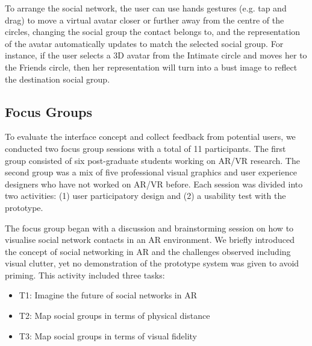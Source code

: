 To arrange the social network, the user can use hands gestures (e.g. tap and drag) to move a virtual avatar closer or further away from the centre of the circles, changing the social group the contact belongs to, and the representation of the avatar automatically updates to match the selected social group. For instance, if the user selects a 3D avatar from the Intimate circle and moves her to the Friends circle, then her representation will turn into a bust image to reflect the destination social group.



\subsection{Focus Groups}

To evaluate the interface concept and collect feedback from potential users, we conducted two focus group sessions with a total of 11 participants. 
The first group consisted of six post-graduate students working on AR/VR research. The second group was a mix of five professional visual graphics and user experience designers who have not worked on AR/VR before. 
Each session was divided into two activities: (1) user participatory design and (2) a usability test with the prototype. 

The focus group began with a discussion and brainstorming session on how to visualise social network contacts in an AR environment. We briefly introduced the concept of social networking in AR and the challenges observed including visual clutter, yet no demonstration of the prototype system was given to avoid priming.
This activity included three tasks: 

\begin{itemize}
	\item T1: Imagine the future of social networks in AR 
	\item T2: Map social groups in terms of physical distance 
	\item T3: Map social groups in terms of visual fidelity 
\end{itemize}



